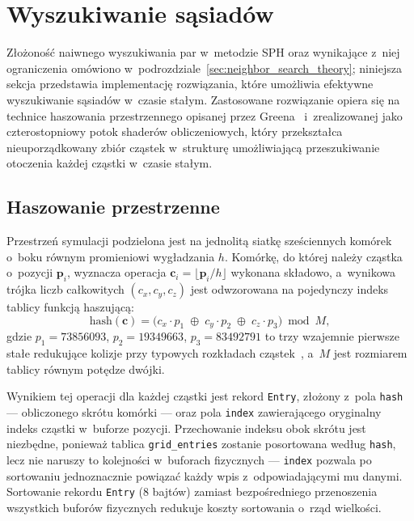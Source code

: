 \section{Wyszukiwanie sąsiadów}
\label{sec:neighbor_search}

Złożoność naiwnego wyszukiwania par w~metodzie SPH oraz wynikające z~niej
ograniczenia omówiono w~podrozdziale~\ref{sec:neighbor_search_theory};
niniejsza sekcja przedstawia implementację rozwiązania, które umożliwia
efektywne wyszukiwanie sąsiadów w~czasie stałym.
Zastosowane rozwiązanie opiera się na technice haszowania przestrzennego
opisanej przez Greena~\cite{green2010particle} i~zrealizowanej jako
czterostopniowy potok shaderów obliczeniowych, który przekształca nieuporządkowany
zbiór cząstek w~strukturę umożliwiającą przeszukiwanie otoczenia każdej
cząstki w~czasie stałym.

\subsection{Haszowanie przestrzenne}
\label{subsec:spatial_hashing}

Przestrzeń symulacji podzielona jest na jednolitą siatkę sześciennych komórek
o~boku równym promieniowi wygładzania $h$.
Komórkę, do której należy cząstka o~pozycji $\mathbf{p}_i$, wyznacza
operacja $\mathbf{c}_i = \lfloor \mathbf{p}_i / h \rfloor$ wykonana składowo,
a~wynikowa trójka liczb całkowitych $(c_x, c_y, c_z)$ jest odwzorowana na
pojedynczy indeks tablicy funkcją haszującą:
\begin{equation}
\label{eq:spatial_hash}
\mathrm{hash}(\mathbf{c}) =
    \bigl(c_x \cdot p_1 \;\oplus\; c_y \cdot p_2 \;\oplus\; c_z \cdot p_3\bigr)
    \bmod M,
\end{equation}
gdzie $p_1 = 73856093$, $p_2 = 19349663$, $p_3 = 83492791$ to trzy wzajemnie
pierwsze stałe redukujące kolizje przy typowych rozkładach cząstek~\cite{teschner2003optimized},
a~$M$ jest rozmiarem tablicy równym potędze dwójki.

Wynikiem tej operacji dla każdej cząstki jest rekord \texttt{Entry}, złożony
z~pola \texttt{hash} --- obliczonego skrótu komórki --- oraz pola \texttt{index}
zawierającego oryginalny indeks cząstki w~buforze pozycji.
Przechowanie indeksu obok skrótu jest niezbędne, ponieważ tablica
\texttt{grid\_entries} zostanie posortowana według \texttt{hash}, lecz nie
naruszy to kolejności w~buforach fizycznych --- \texttt{index} pozwala po
sortowaniu jednoznacznie powiązać każdy wpis z~odpowiadającymi mu danymi.
Sortowanie rekordu \texttt{Entry} (8 bajtów) zamiast bezpośredniego
przenoszenia wszystkich buforów fizycznych redukuje koszty sortowania
o~rząd wielkości.

